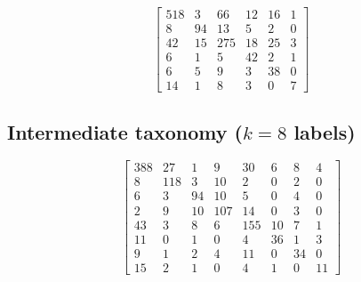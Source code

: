 \begin{table}[h]
\centering
\caption[Gemma domain routing confusion matrix for $k=6$.]{Gemma domain routing confusion matrix for $k=6$ (rows=true, cols=pred). Label order:
\texttt{[socioeconomic\_policy, foreign\_security, governance\_law, environment\_science, society\_culture, misc]}.}
\label{tab:domain_cm_gemma_k5}
\small
\[
\begin{bmatrix}
518 & 3 & 66 & 12 & 16 & 1 \\
8 & 94 & 13 & 5 & 2 & 0 \\
42 & 15 & 275 & 18 & 25 & 3 \\
6 & 1 & 5 & 42 & 2 & 1 \\
6 & 5 & 9 & 3 & 38 & 0 \\
14 & 1 & 8 & 3 & 0 & 7
\end{bmatrix}
\]
\normalsize
\end{table}

\subsection{Intermediate taxonomy ($k=8$ labels)}
\label{app:cm_k8}

\begin{table}[H]
\centering
\caption[DeepSeek domain routing confusion matrix for $k=8$.]{DeepSeek domain routing confusion matrix for $k=8$ (rows=true, cols=pred). Label order:
\texttt{[economy, health\_social, foreign\_security, law\_rights, politics\_government, environment\_energy, society\_culture, misc]}.}
\label{tab:domain_cm_deepseek_k8}
\small
\[
\begin{bmatrix}
388 & 27 & 1 & 9 & 30 & 6 & 8 & 4 \\
8 & 118 & 3 & 10 & 2 & 0 & 2 & 0 \\
6 & 3 & 94 & 10 & 5 & 0 & 4 & 0 \\
2 & 9 & 10 & 107 & 14 & 0 & 3 & 0 \\
43 & 3 & 8 & 6 & 155 & 10 & 7 & 1 \\
11 & 0 & 1 & 0 & 4 & 36 & 1 & 3 \\
9 & 1 & 2 & 4 & 11 & 0 & 34 & 0 \\
15 & 2 & 1 & 0 & 4 & 1 & 0 & 11
\end{bmatrix}
\]
\normalsize
\end{table}

